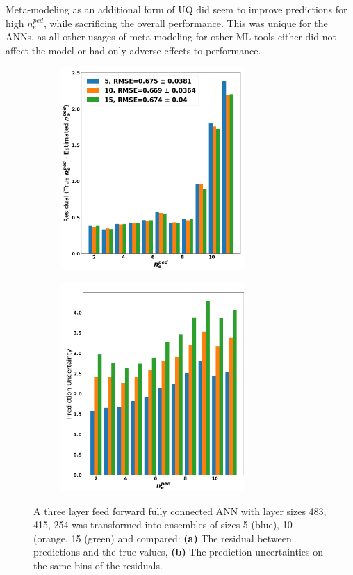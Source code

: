 \documentclass[a4paper, twoside, final, 12pt]{article}
\begin{document}
{Meta-modeling as an additional form of UQ did seem to improve predictions for high $n_e^{ped}$, while sacrificing the overall performance.
This was unique for the ANNs, as all other usages of meta-modeling for other ML tools either did not affect the model or had only adverse effects to performance.
\begin{figure}
	\centering
	\begin{subfigure}{0.48\linewidth}
		\centering
		\includegraphics[width=7cm]{./src/ANN_residual}
				\caption{}
		\label{subfig:ANN_res}
	\end{subfigure}
	\begin{subfigure}{0.5\linewidth}
		\centering
		\includegraphics[width=7cm]{./src/ANN_uncert}
				\caption{}
		\label{subfig:ANN_uncert}
	\end{subfigure}
	\caption{A three layer feed forward fully connected ANN with layer sizes 483, 415, 254 was transformed into ensembles of sizes 5 (blue), 10 (orange, 15 (green) and compared: \textbf{(a)} The residual between predictions and the true values, \textbf{(b)} The prediction uncertainties on the same bins of the residuals. }

\end{figure}}
\end{document}

